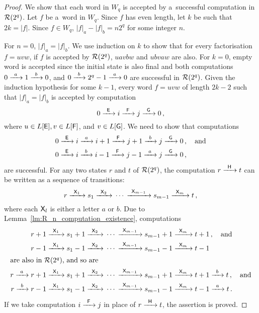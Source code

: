 \begin{proof}
    We show that each word in $W_q$ is accepted by a~successful computation in $\aut{R}(2^q)$. Let $f$ be a~word in $W_q$. Since $f$ has even length, let $k$ be such that $2k = |f|$. Since $f \in W_q$, $|f|_a - |f|_b = n 2^q$ for some integer $n$.

    For $n=0$, $|f|_a = |f|_b$. We use induction on $k$ to show that for every factorisation $f = uvw$, if $f$ is accepted by $\aut{R}(2^q)$, $uavbw$ and $ubvaw$ are also. For $k = 0$, empty word is accepted since the initial state is also final and both computations $0 \tr{a} 1 \tr{b} 0$, and $0 \tr{b} 2^q-1 \tr{a} 0$ are successful in $\aut{R}(2^q)$. Given the induction hypothesis for some $k - 1$, every word $f = uvw$ of length $2k - 2$ such that $|f|_a = |f|_b$ is accepted by computation
    \[
        0 \tr{\re{E}} i \tr{\re{F}} j \tr{\re{G}} 0 \, ,
    \]
    where $u \in L[\re{E}], v \in L[\re{F}]$, and $v \in L[\re{G}]$. We need to show that computations
    \begin{align*}
        0 &\tr{\re{E}} i \tr{a} i+1 \tr{\re{F}} j+1 \tr{b} j \tr{\re{G}} 0 \, , \quad \text{and} \\
        0 &\tr{\re{E}} i \tr{b} i-1 \tr{\re{F}} j-1 \tr{a} j \tr{\re{G}} 0 \, ,
    \end{align*}
    are successful. For any two states $r$ and $t$ of $\aut{R}(2^q)$, the computation $r \tr{\re{H}} t$ can be written as a sequence of transitions:
    \[
        r \tr{\re{X}_1} s_1 \tr{\re{X}_2} \dotsb \tr{\re{X}_{m-1}} s_{m-1} \tr{\re{X}_m} t \, ,
    \]
    where each $\re{X}_l$ is either a letter $a$ or $b$. Due to Lemma~\ref*{lm:R_n_computation_existence}, computations
    \begin{align*}
        r + 1 &\tr{\re{X}_1} s_1 + 1 \tr{\re{X}_2} \dotsb \tr{\re{X}_{m-1}} s_{m-1} + 1 \tr{\re{X}_m} t + 1 \, , \quad \text{and} \\
        r - 1 &\tr{\re{X}_1} s_1 - 1 \tr{\re{X}_2} \dotsb \tr{\re{X}_{m-1}} s_{m-1} - 1 \tr{\re{X}_m} t - 1 \\
    \intertext{are also in $\aut{R}(2^q)$, and so are}
        r \tr{a} r + 1 &\tr{\re{X}_1} s_1 + 1 \tr{\re{X}_2} \dotsb \tr{\re{X}_{m-1}} s_{m-1} + 1 \tr{\re{X}_m} t + 1 \tr{b} t \, , \quad \text{and} \\
        r \tr{b} r - 1 &\tr{\re{X}_1} s_1 - 1 \tr{\re{X}_2} \dotsb \tr{\re{X}_{m-1}} s_{m-1} - 1 \tr{\re{X}_m} t - 1 \tr{a} t \, .
    \end{align*}
    If we take computation $i \tr{\re{F}} j$ in place of $r \tr{\re{H}} t$, the assertion is proved.


\end{proof}
